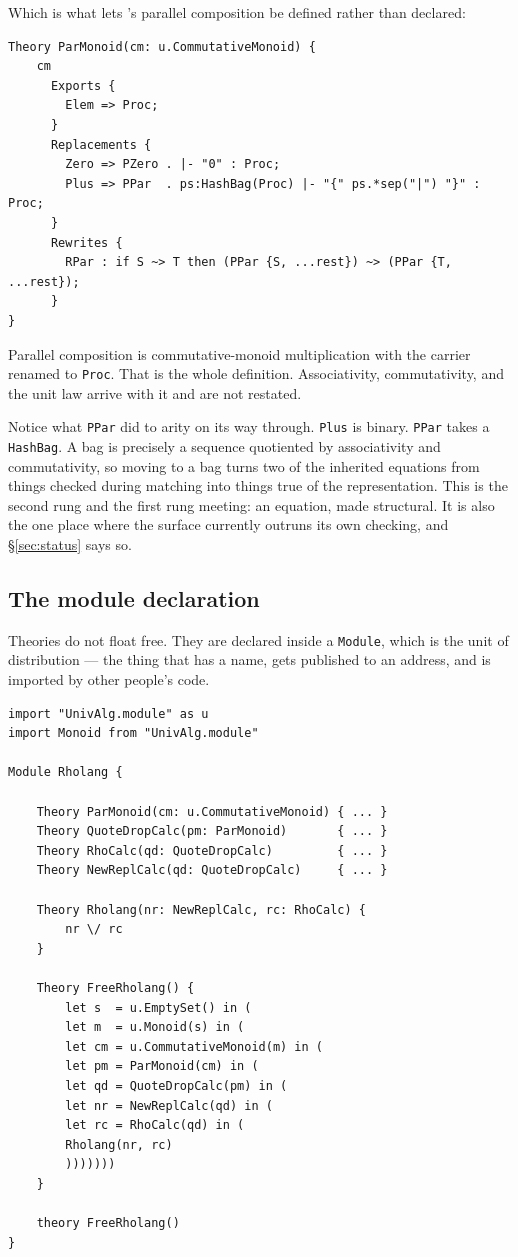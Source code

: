Which is what lets \flang{}'s parallel composition be defined rather than
declared:

\begin{lstlisting}[language=mettail]
Theory ParMonoid(cm: u.CommutativeMonoid) {
    cm
      Exports {
        Elem => Proc;
      }
      Replacements {
        Zero => PZero . |- "0" : Proc;
        Plus => PPar  . ps:HashBag(Proc) |- "{" ps.*sep("|") "}" : Proc;
      }
      Rewrites {
        RPar : if S ~> T then (PPar {S, ...rest}) ~> (PPar {T, ...rest});
      }
}
\end{lstlisting}

Parallel composition is commutative-monoid multiplication with the carrier
renamed to \texttt{Proc}. That is the whole definition. Associativity,
commutativity, and the unit law arrive with it and are not restated.

\begin{aside}
Notice what \texttt{PPar} did to arity on its way through. \texttt{Plus} is
binary. \texttt{PPar} takes a \texttt{HashBag}. A bag is precisely a sequence
quotiented by associativity and commutativity, so moving to a bag turns two of
the inherited equations from things checked during matching into things true of
the representation. This is the second rung and the first rung meeting: an
equation, made structural. It is also the one place where the surface currently
outruns its own checking, and \S\ref{sec:status} says so.
\end{aside}

\subsection{The module declaration}
\label{sec:module}

Theories do not float free. They are declared inside a \texttt{Module}, which is
the unit of distribution --- the thing that has a name, gets published to an
address, and is imported by other people's code.

\begin{lstlisting}[language=mettail]
import "UnivAlg.module" as u
import Monoid from "UnivAlg.module"

Module Rholang {

    Theory ParMonoid(cm: u.CommutativeMonoid) { ... }
    Theory QuoteDropCalc(pm: ParMonoid)       { ... }
    Theory RhoCalc(qd: QuoteDropCalc)         { ... }
    Theory NewReplCalc(qd: QuoteDropCalc)     { ... }

    Theory Rholang(nr: NewReplCalc, rc: RhoCalc) {
        nr \/ rc
    }

    Theory FreeRholang() {
        let s  = u.EmptySet() in (
        let m  = u.Monoid(s) in (
        let cm = u.CommutativeMonoid(m) in (
        let pm = ParMonoid(cm) in (
        let qd = QuoteDropCalc(pm) in (
        let nr = NewReplCalc(qd) in (
        let rc = RhoCalc(qd) in (
        Rholang(nr, rc)
        )))))))
    }

    theory FreeRholang()
}
\end{lstlisting}


